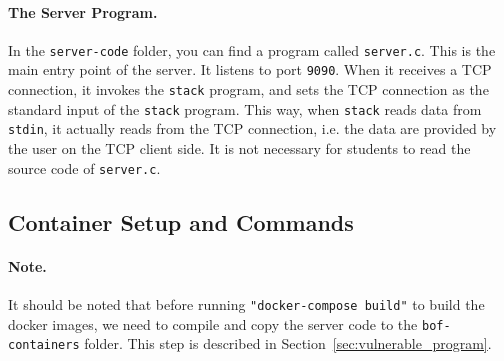 \paragraph{The Server Program.} 
In the \texttt{server-code} folder, you can find a program called \texttt{server.c}. 
This is the main entry point of the server. It listens to port \texttt{9090}. 
When it receives a TCP connection, it 
invokes the \texttt{stack} program, and sets the TCP connection
as the standard input of the \texttt{stack} program. This way,
when \texttt{stack} reads data from \texttt{stdin}, it actually 
reads from the TCP connection, i.e. the data are provided by
the user on the TCP client side. It is not necessary for 
students to read the source code of \texttt{server.c}.  


\subsection{Container Setup and Commands}




\paragraph{Note.} It should be noted that before running 
\texttt{"docker-compose build"} to build the docker
images, we need to compile and copy the server 
code to the \texttt{bof-containers} folder. 
This step is described in Section~\ref{sec:vulnerable_program}.


